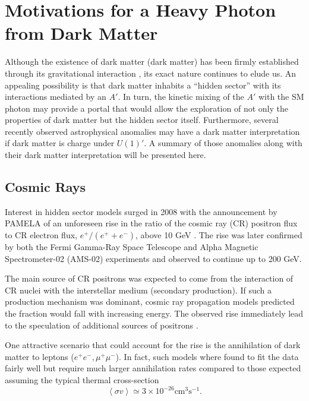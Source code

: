 \section{Motivations for a Heavy Photon from Dark Matter} \label{sec:mot_dm}

Although the existence of dark matter (dark matter) has been firmly established through its
gravitational interaction 
\cite{Zwicky:1933gu, Rubin:1980zd, Clowe:2006eq, Adam:2015rua}, its exact nature
continues to elude us. An appealing
possibility is that dark matter inhabits a ``hidden sector'' with its interactions 
mediated by an $A'$.  In turn, the kinetic mixing of the $A'$ with the SM 
photon may provide a portal that would allow the exploration of not only the 
properties of dark matter but the hidden sector itself.  Furthermore, several recently
observed astrophysical anomalies \cite{Adriani:2008zr, ackermann2012, aguilar2013, 
hooper2011, linden2011, abazajian2012, hooper2013, Bulbul:2014sua}
may have a dark matter interpretation if dark matter is
charge under $U(1)'$.  A summary of those anomalies along with their dark matter
interpretation will be presented here.

\subsection{Cosmic Rays}

Interest in hidden sector models surged in 2008 with the announcement by 
PAMELA of an unforeseen rise in the ratio of the cosmic ray (CR) positron flux
to CR electron flux, $e^{+}/(e^{+} + e^{-})$, above 10 GeV \cite{Adriani:2008zr}.
The rise was later confirmed by both the 
Fermi Gamma-Ray Space Telescope \cite{ackermann2012} and Alpha Magnetic 
Spectrometer-02 (AMS-02) \cite{aguilar2013} experiments and observed to continue
up to 200 GeV. 

The main source of CR positrons 
was expected to come from the interaction of CR nuclei with the interstellar 
medium (secondary production).  If such a production mechanism was dominant, 
cosmic ray propagation models predicted the fraction would fall with increasing
energy.  The observed rise immediately lead to the speculation of additional sources of 
positrons \cite{yin2013, linden2013}.

One attractive scenario that could account for the rise is the annihilation of
dark matter to leptons ($e^+e^-, \mu^+\mu^-$). In fact, such models where found to fit 
the data fairly well but require much 
larger annihilation rates compared to those expected assuming the typical 
thermal cross-section \cite{Cholis:2008hb}
\begin{equation}
    \left \langle \sigma v \right \rangle \simeq 3 \times 10^{-26} \text{cm}^3 \text{s}^{-1}.
\end{equation}

